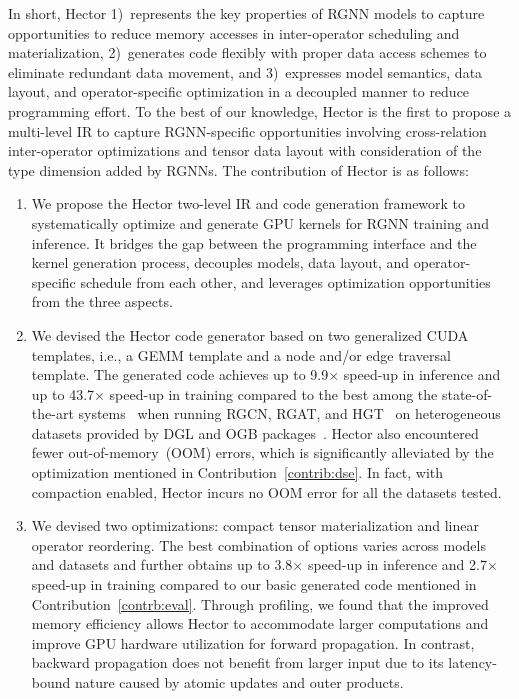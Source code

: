 In short, Hector 1)~represents the key properties of RGNN models to capture opportunities to reduce memory accesses in inter-operator scheduling and materialization, 2)~generates code flexibly with proper data access schemes to eliminate redundant data movement, and 3)~expresses model semantics, data layout, and operator-specific optimization in a decoupled manner to reduce programming effort. To the best of our knowledge, Hector is the first to propose a multi-level IR to capture RGNN-specific opportunities involving cross-relation inter-operator optimizations and tensor data layout with consideration of the type dimension added by RGNNs.
The contribution of Hector is as follows:
\begin{enumerate}
\item We propose the Hector two-level IR and code generation framework to systematically optimize and generate GPU kernels for RGNN training and inference. It bridges the gap between the programming interface and the kernel generation process, decouples models, data layout, and operator-specific schedule from each other, and leverages optimization opportunities from the three aspects.
\item \label{contrb:eval} We devised the Hector code generator based on two generalized CUDA templates, {i.e., a} GEMM template and a node and/or edge traversal template. The generated code {achieves} up to 9.9$\times$ speed-up in inference and up to 43.7$\times$ speed-up in training compared to the {best among the} state-of-the-art systems~\cite{wuSeastarVertexcentricProgramming2021, xieGraphilerCompilerGraph, guiHGLAcceleratingHeterogeneous} when running RGCN, RGAT, and HGT~\cite{rgcn, busbridge2019relational, hgt} on heterogeneous datasets provided by DGL and OGB packages~\cite{huOpenGraphBenchmark2021, aifb, mutag, bgs, am, toutanovaObservedLatentFeatures2015}. Hector also encountered fewer out-of-memory~(OOM) errors, which is significantly alleviated by the optimization mentioned in Contribution~\ref{contrib:dse}. 
{In fact, with compaction enabled, Hector incurs no OOM error for all the datasets tested.}
\item \label{contrib:dse} We devised two optimizations: compact tensor materialization and linear operator reordering.
The best combination of options varies across models and datasets and further obtains up to 3.8$\times$ speed-up in inference and 2.7$\times$ speed-up in training compared to our basic generated code mentioned in Contribution~\ref{contrb:eval}. 
Through profiling, we found that the improved memory efficiency allows Hector to accommodate larger computations and improve GPU hardware utilization for forward propagation. In contrast, backward propagation does not benefit from larger input due to its latency-bound nature caused by atomic updates and outer products. 
\end{enumerate}
